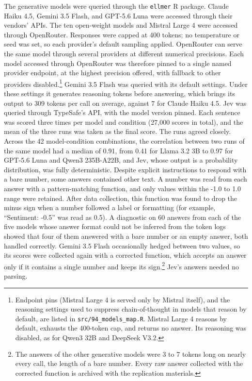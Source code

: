 \documentclass[
  man,
  floatsintext,
  longtable,
  nolmodern,
  notxfonts,
  notimes,
  colorlinks=true,linkcolor=blue,citecolor=blue,urlcolor=blue]{apa7}
\begin{document}
The generative models were queried through the \texttt{ellmer} R
package. Claude Haiku 4.5, Gemini 3.5 Flash, and GPT-5.6 Luna were
accessed through their vendors' APIs. The ten open-weight models and
Mistral Large 4 were accessed through OpenRouter. Responses were capped
at 400 tokens; no temperature or seed was set, so each provider's
default sampling applied. OpenRouter can serve the same model through
several providers at different numerical precisions. Each model accessed
through OpenRouter was therefore pinned to a single named provider
endpoint, at the highest precision offered, with fallback to other
providers disabled.\footnote{Endpoint pins (Mistral Large 4 is served
  only by Mistral itself), and the reasoning settings used to suppress
  chain-of-thought in models that reason by default, are listed in
  \texttt{src/94\_models\_map.R}. Mistral Large 4 reasons by default,
  exhausts the 400-token cap, and returns no answer. Its reasoning was
  disabled, as for Qwen3 32B and DeepSeek V3.2.} Gemini 3.5 Flash was
queried with its default settings. Under these settings it generates
reasoning tokens before answering, which brings its output to 309 tokens
per call on average, against 7 for Claude Haiku 4.5. Jev was queried
through TypeSafe's API, with the model version pinned. Each sentence was
scored three times per model and condition (27,000 scores in total), and
the mean of the three runs was taken as the final score. The runs agreed
closely. Across the 42 model-condition combinations, the correlation
between two runs of the same model had a median of 0.91, from 0.41 for
Llama 3.2 3B to 0.97 for GPT-5.6 Luna and Qwen3 235B-A22B, and Jev,
whose output is a probability distribution, was fully deterministic.
Despite explicit instructions to respond with a bare number, some
answers contained other text. A number was read from each answer with a
pattern-matching function, and only values within the -1.0 to 1.0 range
were retained. After data collection, this function was found to drop
the minus sign when a number followed a label or formatting (for
example, ``Sentiment: -0.5'' was read as 0.5). A diagnostic on 60
answers from each of the five models whose answer format could not be
inferred from the token logs showed that four of them answered with a
bare number or an empty answer, both handled correctly. Gemini 3.5 Flash
occasionally hedged between two values, so its scores were collected
again with a corrected function, which accepts an answer only if it
contains a single number and keeps its sign.\footnote{The answers of the
  other generative models were 3 to 7 tokens long on nearly every call,
  the length of a bare number. Every raw answer collected with the
  corrected function is archived with the replication materials.} Jev's
answers needed no parsing.
\end{document}
